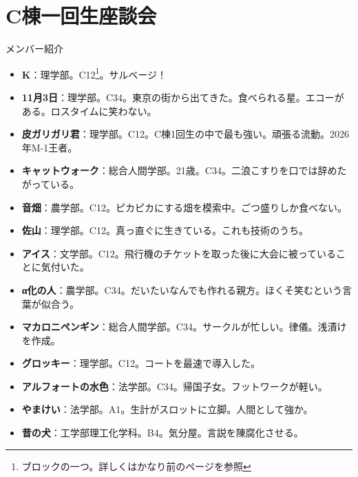 \section{C棟一回生座談会}

\newcommand{\talkerc}[1]{\noindent{\gtfamily \bfseries#1}:}

\begin{itembox}[m]{\LARGE メンバー紹介}
    \begin{itemize}
        \item {\bfseries K}：理学部。C12\footnote{ブロックの一つ。詳しくはかなり前のページを参照}。サルベージ！
        \item {\bfseries 11月3日}：理学部。C34。東京の街から出てきた。食べられる星。エコーがある。ロスタイムに笑わない。
        \item {\bfseries 皮ガリガリ君}：理学部。C12。C棟1回生の中で最も強い。頑張る流動。2026年M-1王者。
        \item {\bfseries キャットウォーク}：総合人間学部。21歳。C34。二浪こすりを口では辞めたがっている。
        \item {\bfseries 音畑}：農学部。C12。ピカピカにする畑を模索中。ごつ盛りしか食べない。
        \item {\bfseries 佐山}：理学部。C12。真っ直ぐに生きている。これも技術のうち。
        \item {\bfseries アイス}：文学部。C12。飛行機のチケットを取った後に大会に被っていることに気付いた。
        \item {\bfseries α化の人}：農学部。C34。だいたいなんでも作れる親方。ほくそ笑むという言葉が似合う。
        \item {\bfseries マカロニペンギン}：総合人間学部。C34。サークルが忙しい。律儀。浅漬けを作成。
        \item {\bfseries グロッキー}：理学部。C12。コートを最速で導入した。
        \item {\bfseries アルフォートの水色}：法学部。C34。帰国子女。フットワークが軽い。
        \item {\bfseries やまけい}：法学部。A1。生計がスロットに立脚。人間として強か。
        \item {\bfseries 昔の犬}：工学部理工化学科。B4。気分屋。言説を陳腐化させる。
    \end{itemize}
\end{itembox}

